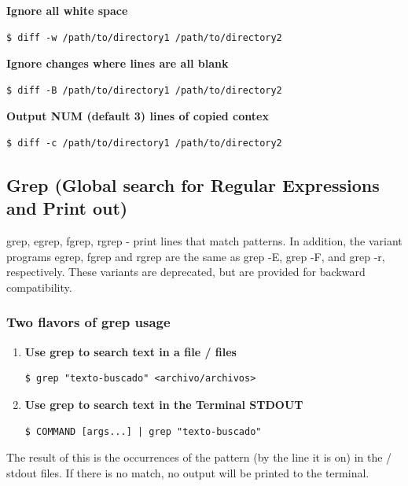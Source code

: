 \documentclass{article}
\newenvironment{blocktemplate}[1]{%
    \tcolorbox[beamer,%
    noparskip,breakable,
    colframe=Blue,%
    colbacklower=LimeGreen!75!LightGreen,%
    title=#1]}%
    {\endtcolorbox}
\newenvironment{codetemplate}[1][]{%
  \mybasecolorbox[#1]
  \itshape
}{%
  \endmybasecolorbox
}
\begin{document}
\textbf{Ignore all white space}
\begin{codetemplate}{}
\begin{verbatim}
$ diff -w /path/to/directory1 /path/to/directory2
\end{verbatim}
\end{codetemplate}

\textbf{Ignore changes where lines are all blank}
\begin{codetemplate}{}
\begin{verbatim}
$ diff -B /path/to/directory1 /path/to/directory2
\end{verbatim}
\end{codetemplate}

\textbf{Output NUM (default 3) lines of copied contex}
\begin{codetemplate}{}
\begin{verbatim}
$ diff -c /path/to/directory1 /path/to/directory2
\end{verbatim}
\end{codetemplate}

\subsection{Grep (Global search for Regular Expressions and Print out)}

\begin{blocktemplate}{Nota}
grep, egrep, fgrep, rgrep - print lines that match patterns.
In addition, the variant programs egrep, fgrep and rgrep are the same as grep -E, grep -F, and grep -r, respectively.  These variants are deprecated, but are provided for backward compatibility.
\end{blocktemplate}

\subsubsection{Two flavors of grep usage}
\begin{enumerate}
    \item \textbf{Use grep to search text in a file / files}
\begin{codetemplate}{}
\begin{verbatim}
$ grep "texto-buscado" <archivo/archivos>
\end{verbatim}
\end{codetemplate}

    \item \textbf{Use grep to search text in the Terminal STDOUT}
\begin{codetemplate}{}
\begin{verbatim}
$ COMMAND [args...] | grep "texto-buscado"
\end{verbatim}
\end{codetemplate}
\end{enumerate}
The result of this is the occurrences of the pattern (by the line it is on) in the / stdout files. If there is no match, no output will be printed to the terminal.
\end{document}

